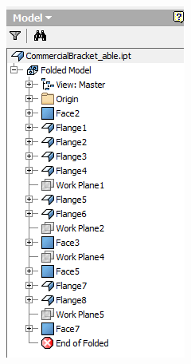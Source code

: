\begin{minipage}{\linewidth}
\begin{minipage}[c]{0.62\linewidth}
\end{minipage}
\quad
\begin{minipage}[c]{0.3\linewidth}
\includegraphics[width=\linewidth,valign=t]{../Common/images/CommercialBracket_Defeatured_tree}
 \label{fig:results:CommercialBracket_Defeatured_tree}
\end{minipage}
\end{minipage}

